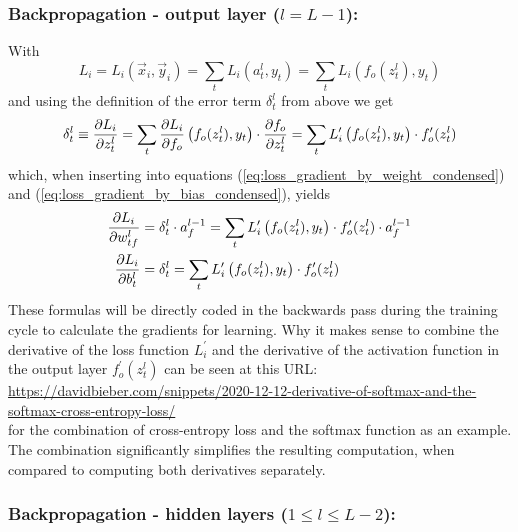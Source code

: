 \subsubsection*{Backpropagation - output layer ($l = L-1$):}

With
\begin{equation}
    L_i = L_i(\vec{x}_i, \vec{y}_i) = \sum\limits_t L_i(a_t^l,y_t)
    = \sum\limits_t L_i \left( f_o(z_t^l),y_t \right)
\end{equation}
and using the definition of the error term $\delta_t^l$ from above we get
\begin{equation}
    \delta_t^l \equiv \frac{\partial {L_i}}{\partial {z_t^l}} = \sum\limits_t \frac{\partial {L_i}}{\partial {f_o}}
    \left( f_o(z_t^l),y_t \right) \cdot \frac{\partial {f_o}}{\partial {z_t^l}}
    = \sum\limits_t L_i^\prime \left( f_o(z_t^l),y_t \right)
    \cdot f_o^\prime(z_t^l)
\end{equation}
which, when inserting into equations (\ref{eq:loss_gradient_by_weight_condensed}) and
(\ref{eq:loss_gradient_by_bias_condensed}), yields
\begin{subequations}
    \begin{align}
        \frac{\partial {L_i}}{\partial {w_{tf}^l}} & = \delta_t^l \cdot a^{l-1}_f =
        \sum\limits_t L_i^\prime \left( f_o(z_t^l),y_t \right)
        \cdot f_o^\prime(z_t^l) \cdot a^{l-1}_f 
        \label{eq:loss_gradient_by_weight_expanded}\\
        \frac{\partial {L_i}}{\partial {b^l_t}} & = \delta_t^l = 
        \sum\limits_t L_i^\prime \left( f_o(z_t^l),y_t \right)
        \cdot f_o^\prime(z_t^l)
        \label{eq:loss_gradient_by_bias_expanded}
    \end{align}
\end{subequations}
These formulas will be directly coded in the backwards pass during the training cycle to
calculate the gradients for learning. Why it makes sense to combine the derivative of the
loss function $L_i^\prime$ and the derivative of the activation function in the output
layer $f_o^\prime(z_t^l)$ can be seen at this URL:\\
\tiny
\url{https://davidbieber.com/snippets/2020-12-12-derivative-of-softmax-and-the-softmax-cross-entropy-loss/}
\normalsize \\
for the combination of cross-entropy loss and the softmax function as an example. The
combination significantly simplifies the resulting computation, when compared to computing
both derivatives separately.

\subsubsection*{Backpropagation - hidden layers ($1 \leq l \leq L-2$):}

